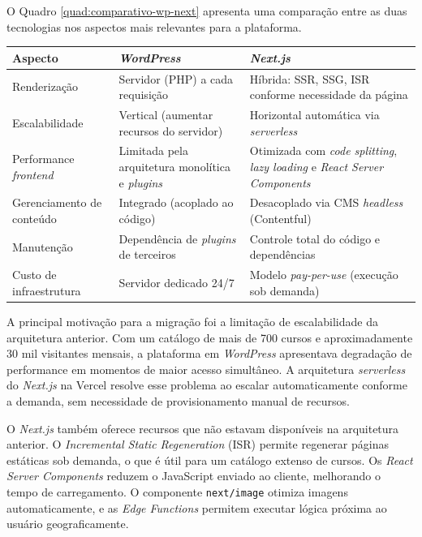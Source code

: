 O Quadro \ref{quad:comparativo-wp-next} apresenta uma comparação entre as duas tecnologias nos aspectos mais relevantes para a plataforma.

\begin{quadro}[htb]
\centering
\caption{Comparativo entre \textit{WordPress} e \textit{Next.js} para a Achievece}
\label{quad:comparativo-wp-next}
\begin{tabular}{|p{3.5cm}|p{5cm}|p{5cm}|}
\hline
\textbf{Aspecto} & \textbf{\textit{WordPress}} & \textbf{\textit{Next.js}} \\
\hline
Renderização & Servidor (PHP) a cada requisição & Híbrida: SSR, SSG, ISR conforme necessidade da página \\
\hline
Escalabilidade & Vertical (aumentar recursos do servidor) & Horizontal automática via \textit{serverless} \\
\hline
Performance \textit{frontend} & Limitada pela arquitetura monolítica e \textit{plugins} & Otimizada com \textit{code splitting}, \textit{lazy loading} e \textit{React Server Components} \\
\hline
Gerenciamento de conteúdo & Integrado (acoplado ao código) & Desacoplado via CMS \textit{headless} (Contentful) \\
\hline
Manutenção & Dependência de \textit{plugins} de terceiros & Controle total do código e dependências \\
\hline
Custo de infraestrutura & Servidor dedicado 24/7 & Modelo \textit{pay-per-use} (execução sob demanda) \\
\hline
\end{tabular}
\end{quadro}

A principal motivação para a migração foi a limitação de escalabilidade da arquitetura anterior. Com um catálogo de mais de 700 cursos e aproximadamente 30 mil visitantes mensais, a plataforma em \textit{WordPress} apresentava degradação de performance em momentos de maior acesso simultâneo. A arquitetura \textit{serverless} do \textit{Next.js} na Vercel resolve esse problema ao escalar automaticamente conforme a demanda, sem necessidade de provisionamento manual de recursos.

O \textit{Next.js} também oferece recursos que não estavam disponíveis na arquitetura anterior. O \textit{Incremental Static Regeneration} (ISR) permite regenerar páginas estáticas sob demanda, o que é útil para um catálogo extenso de cursos. Os \textit{React Server Components} reduzem o JavaScript enviado ao cliente, melhorando o tempo de carregamento. O componente \texttt{next/image} otimiza imagens automaticamente, e as \textit{Edge Functions} permitem executar lógica próxima ao usuário geograficamente.

